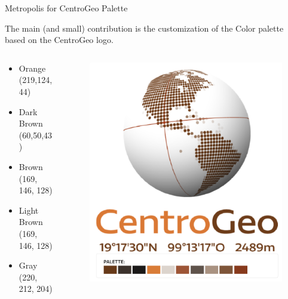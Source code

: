 \documentclass[10pt]{beamer}
\begin{document}
\begin{frame}[fragile]{Metropolis for CentroGeo Palette}

The main (and small) contribution is the customization of the Color palette based on the CentroGeo logo.

\begin{columns}
\begin{column}{0.5\textwidth}


	\begin{itemize}
		\item \textcolor{orange@centrogeo}{Orange (219,124,44) }
		\item \textcolor{darkbrown@centrogeo}{Dark Brown (60,50,43) }
		\item \textcolor{brown@centrogeo}{Brown (169, 146, 128) }
		\item \textcolor{lightbrown@centrogeo}{Light Brown (169, 146, 128) }
		\item \textcolor{gray@centrogeo}{Gray (220, 212, 204) }
	\end{itemize}

\end{column}
\begin{column}{0.5\textwidth}  %

\begin{figure}
\centering
\includegraphics[width=0.7\columnwidth]{figures/cgeopalette.png}
\end{figure}

\end{column}
\end{columns}


\end{frame}
\end{document}
